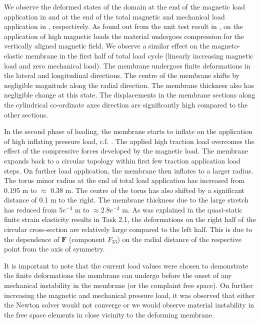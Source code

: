\documentclass[11pt,a4paper,final]{article}
\begin{document}
We observe the deformed states of the domain at the end of the magnetic load application  in  and at the end of the total magnetic and mechanical load application in , respectively. As found out from the unit test result in , on the application of high magnetic loads the material undergoes compression for the vertically aligned magnetic field. We observe a similar effect on the magneto-elastic membrane in the first half of total load cycle (linearly increasing magnetic load and zero mechanical load). The membrane undergoes finite deformations in the lateral and longitudinal directions. The centre of the membrane shifts by negligible magnitude along the radial direction. The membrane thickness also has negligible change at this state. The displacements in the membrane sections along the cylindrical co-ordinate axes direction are significantly high compared to the other sections. \par 
In the second phase of loading, the membrane starts to inflate on the application of high inflating pressure load, c.f. . The applied high traction load overcomes the effect of the compressive forces developed by the magnetic load. The membrane expands back to a circular topology within first few traction application load steps. On further load application, the membrane then inflates to a larger radius. The torus minor radius at the end of total load application has increased from 0.195 m to $\approx$ 0.38 m. The centre of the torus has also shifted by a significant distance of 0.1 m to the right. The membrane thickness due to the large stretch has reduced from $5e^{-3}$ m to $\approx 2.8e^{-3}$ m. As was explained in the quasi-static finite strain elasticity results in Task 2.1, the deformations on the right half of the circular cross-section are relatively large compared to the left half. This is due to the dependence of $\mathbf{F}$ (component $F_{33}$) on the radial distance of the respective point from the axis of symmetry. \par 

It is important to note that the current load values were chosen to demonstrate the finite deformations the membrane can undergo before the onset of any mechanical instability in the membrane (or the complaint free space). On further increasing the magnetic and mechanical pressure load, it was observed that either the Newton solver would not converge or we would observe material instability in the free space elements in close vicinity to the deforming membrane. \par 
\end{document}
